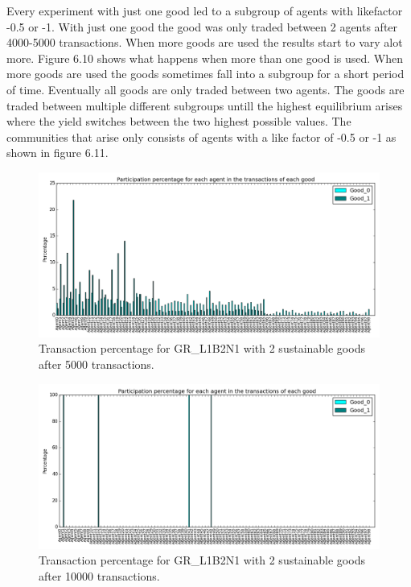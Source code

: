 \documentclass[twoside,openright]{uva-bachelor-thesis}
\begin{document}
 Every experiment with just one good led to a subgroup of agents with likefactor -0.5 or -1. With just one good the good was only traded between 2 agents after 4000-5000 transactions. When more goods are used the results start to vary alot more. Figure 6.10 shows what happens when more than one good is used. When more goods are used the goods sometimes fall into a subgroup for a short period of time. Eventually all goods are only traded between two agents. The goods are traded between multiple different subgroups untill the highest equilibrium arises where the yield switches between the two highest possible values. The communities that arise only consists of agents with a like factor of -0.5 or -1 as shown in figure 6.11. \\
\begin{figure}[h!]
  \centering
  \includegraphics[scale=0.4]{Simulation2_figures/GR_L1B2N1/Figure3_2goods_5k}
  \caption{Transaction percentage for GR\_L1B2N1 with 2 sustainable goods after 5000 transactions.}
\end{figure}

\begin{figure}[h!]
  \centering
  \includegraphics[scale=0.4]{Simulation2_figures/GR_L1B2N1/Figure4_2goods_10k}
  \caption{Transaction percentage for GR\_L1B2N1 with 2 sustainable goods after 10000 transactions.}
\end{figure}
\end{document}
